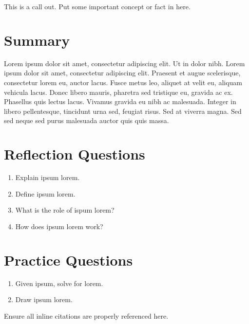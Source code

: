 \documentclass[
]{book}
\providecommand{\tightlist}{%
  \setlength{\itemsep}{0pt}\setlength{\parskip}{0pt}}
\begin{document}
This is a call out. Put some important concept or fact in here.

\hypertarget{summary-2}{%
\section{Summary}\label{summary-2}}

Lorem ipsum dolor sit amet, consectetur adipiscing elit. Ut in dolor nibh. Lorem ipsum dolor sit amet, consectetur adipiscing elit. Praesent et augue scelerisque, consectetur lorem eu, auctor lacus. Fusce metus leo, aliquet at velit eu, aliquam vehicula lacus. Donec libero mauris, pharetra sed tristique eu, gravida ac ex. Phasellus quis lectus lacus. Vivamus gravida eu nibh ac malesuada. Integer in libero pellentesque, tincidunt urna sed, feugiat risus. Sed at viverra magna. Sed sed neque sed purus malesuada auctor quis quis massa.

\hypertarget{reflection-questions-1}{%
\section*{Reflection Questions}\label{reflection-questions-1}}

\begin{enumerate}
\def\labelenumi{\arabic{enumi}.}
\tightlist
\item
  Explain ipsum lorem.
\item
  Define ipsum lorem.
\item
  What is the role of ispum lorem?
\item
  How does ipsum lorem work?
\end{enumerate}

\hypertarget{practice-questions-1}{%
\section*{Practice Questions}\label{practice-questions-1}}

\begin{enumerate}
\def\labelenumi{\arabic{enumi}.}
\setcounter{enumi}{1}
\tightlist
\item
  Given ipsum, solve for lorem.
\item
  Draw ipsum lorem.
\end{enumerate}

Ensure all inline citations are properly referenced here.
\end{document}
